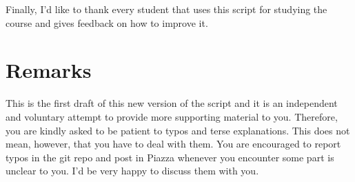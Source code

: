 Finally, I'd like to thank every student that uses this script for studying the course and gives feedback on how to improve it.

\section*{Remarks}

This is the first draft of this new version of the script and it is an independent and voluntary attempt to provide more supporting material to you. Therefore, you
are kindly asked to be patient to typos and terse explanations. This does
not mean, however, that you have to deal with them. You are 
encouraged to report typos in the git repo and post in Piazza whenever you encounter
some part is unclear to you. I'd be very happy to discuss them with you.